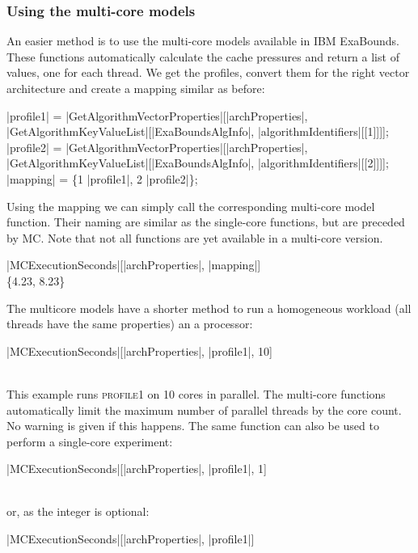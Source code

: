 \subsubsection{Using the multi-core models}

An easier method is to use the multi-core models available in IBM ExaBounds. These functions automatically calculate the cache pressures and return a list of values, one for each thread. We get the profiles, convert them for the right vector architecture and create a mapping similar as before:
\begin{mma}
 \In |profile1| = |GetAlgorithmVectorProperties|[|archProperties|, \linebreak |GetAlgorithmKeyValueList|[|ExaBoundsAlgInfo|, \linebreak|algorithmIdentifiers|[[1]]]]; \\
 \In |profile2| = |GetAlgorithmVectorProperties|[|archProperties|, \linebreak|GetAlgorithmKeyValueList|[|ExaBoundsAlgInfo|, \linebreak|algorithmIdentifiers|[[2]]]]; \\
 \In |mapping| = \{1 \rightarrow |profile1|, 2 \rightarrow |profile2|\}; \\
\end{mma}

Using the mapping we can simply call the corresponding multi-core model function. Their naming are similar as the single-core functions, but are preceded by \textsc{MC}. Note that not all functions are yet available in a multi-core version.
\begin{mma}
 \In |MCExecutionSeconds|[|archProperties|, |mapping|] \\
 \Out \{4.23, 8.23\} \\
\end{mma}

The multicore models have a shorter method to run a homogeneous workload (all threads have the same properties) an a processor:
\begin{mma}
 \In |MCExecutionSeconds|[|archProperties|, |profile1|, 10] \\
  \\
\end{mma}
This example runs \textsc{profile1} on 10 cores in parallel. The multi-core functions automatically limit the maximum number of parallel threads by the core count. No warning is given if this happens. The same function can also be used to perform a single-core experiment:
\begin{mma}
 \In |MCExecutionSeconds|[|archProperties|, |profile1|, 1] \\
  \\
\end{mma}
or, as the integer is optional:
\begin{mma}
 \In |MCExecutionSeconds|[|archProperties|, |profile1|] \\
  \\
\end{mma}

